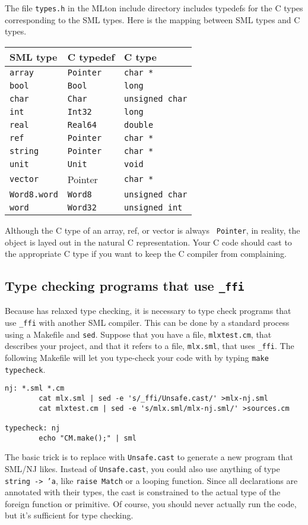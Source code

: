 The file {\tt types.h} in the MLton include directory includes
typedefs for the C types corresponding to the SML types.
Here is the mapping between SML types and C types.

\begin{center}
\begin{tabular}{lll}
SML type & C typedef & C type\\
\hline
{\tt array} & {\tt Pointer} & {\tt char *} \\
{\tt bool} & {\tt Bool} & {\tt long} \\
{\tt char} & {\tt Char} & {\tt unsigned char} \\
{\tt int} & {\tt Int32} & {\tt long} \\
{\tt real} & {\tt Real64} & {\tt double} \\
{\tt ref} & {\tt Pointer} & {\tt char *} \\
{\tt string} & {\tt Pointer} & {\tt char *} \\
{\tt unit} & {\tt Unit} & {\tt void} \\
{\tt vector} & Pointer & {\tt char *} \\
{\tt Word8.word} & {\tt Word8} & {\tt unsigned char} \\
{\tt word} & {\tt Word32} & {\tt unsigned int} \\
\end{tabular}
\end{center}

Although the C type of an array, ref, or vector is always {\tt
Pointer}, in reality, the object is layed out in the natural C
representation.  Your C code should cast to the appropriate C type if
you want to keep the C compiler from complaining.

\subsection{Type checking programs that use {\tt \_ffi}}

Because {\mlton} has relaxed type checking, it is necessary to
type check programs that use {\tt \_ffi} with another SML compiler.
This can be done by a standard process using a Makefile and {\tt sed}.
Suppose that you have a file, {\tt mlxtest.cm}, that describes your
{\mlton} project, and that it refers to a file, {\tt mlx.sml}, that
uses {\tt \_ffi}.  The following Makefile will let you type-check your
code with {\smlnj} by typing {\tt make typecheck}.

\begin{verbatim}
nj: *.sml *.cm
        cat mlx.sml | sed -e 's/_ffi/Unsafe.cast/' >mlx-nj.sml
        cat mlxtest.cm | sed -e 's/mlx.sml/mlx-nj.sml/' >sources.cm

typecheck: nj
        echo "CM.make();" | sml
\end{verbatim}

The basic trick is to replace {\ffi} with {\tt Unsafe.cast} to generate a new
program that SML/NJ likes.  Instead of {\tt Unsafe.cast}, you could also use
anything of type {\tt string -> 'a}, like {\tt raise Match} or a looping
function.  Since all {\ffi} declarations are annotated with their types, the
cast is constrained to the actual type of the foreign function or primitive. Of
course, you should never actually run the code, but it's sufficient for type
checking.
